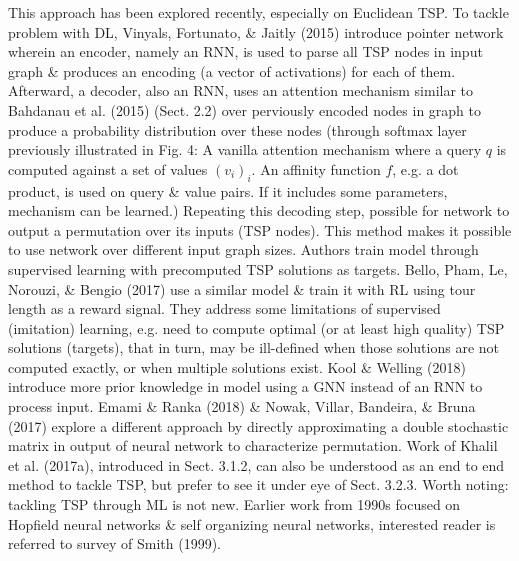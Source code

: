 \documentclass{article}
\begin{document}
\begin{itemize}
\begin{itemize}
\begin{itemize}
            This approach has been explored recently, especially on Euclidean TSP. To tackle problem with DL, Vinyals, Fortunato, \& Jaitly (2015) introduce pointer network wherein an encoder, namely an RNN, is used to parse all TSP nodes in input graph \& produces an encoding (a vector of activations) for each of them. Afterward, a decoder, also an RNN, uses an attention mechanism similar to Bahdanau et al. (2015) (Sect. 2.2) over perviously encoded nodes in graph to produce a probability distribution over these nodes (through softmax layer previously illustrated in {\sf Fig. 4: A vanilla attention mechanism where a query $q$ is computed against a set of values $(v_i)_i$. An affinity function $f$, e.g. a dot product, is used on query \& value pairs. If it includes some parameters, mechanism can be learned.}) Repeating this decoding step, possible for network to output a permutation over its inputs (TSP nodes). This method makes it possible to use network over different input graph sizes. Authors train model through supervised learning with precomputed TSP solutions as targets. Bello, Pham, Le, Norouzi, \& Bengio (2017) use a similar model \& train it with RL using tour length as a reward signal. They address some limitations of supervised (imitation) learning, e.g. need to compute optimal (or at least high quality) TSP solutions (targets), that in turn, may be ill-defined when those solutions are not computed exactly, or when multiple solutions exist. Kool \& Welling (2018) introduce more prior knowledge in model using a GNN instead of an RNN to process input. Emami \& Ranka (2018) \& Nowak, Villar, Bandeira, \& Bruna (2017) explore a different approach by directly approximating a double stochastic matrix in output of neural network to characterize permutation. Work of Khalil et al. (2017a), introduced in Sect. 3.1.2, can also be understood as an end to end method to tackle TSP, but prefer to see it under eye of Sect. 3.2.3. Worth noting: tackling TSP through ML is not new. Earlier work from 1990s focused on Hopfield neural networks \& self organizing neural networks, interested reader is referred to survey of Smith (1999).


\end{itemize}
\end{itemize}
\end{itemize}
\end{document}
